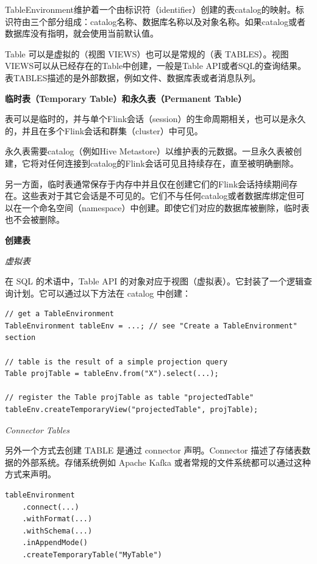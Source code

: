 \documentclass[cn,11pt,chinese]{elegantbook}
\begin{document}
TableEnvironment维护着一个由标识符（identifier）创建的表catalog的映射。标识符由三个部分组成：catalog名称、数据库名称以及对象名称。如果catalog或者数据库没有指明，就会使用当前默认值。

Table 可以是虚拟的（视图 VIEWS）也可以是常规的（表 TABLES）。视图VIEWS可以从已经存在的Table中创建，一般是Table API或者SQL的查询结果。表TABLES描述的是外部数据，例如文件、数据库表或者消息队列。

\textbf{临时表（Temporary Table）和永久表（Permanent Table）}

表可以是临时的，并与单个Flink会话（session）的生命周期相关，也可以是永久的，并且在多个Flink会话和群集（cluster）中可见。

永久表需要catalog（例如Hive Metastore）以维护表的元数据。一旦永久表被创建，它将对任何连接到catalog的Flink会话可见且持续存在，直至被明确删除。

另一方面，临时表通常保存于内存中并且仅在创建它们的Flink会话持续期间存在。这些表对于其它会话是不可见的。它们不与任何catalog或者数据库绑定但可以在一个命名空间（namespace）中创建。即使它们对应的数据库被删除，临时表也不会被删除。

\textbf{创建表}

\textit{虚拟表}

在 SQL 的术语中，Table API 的对象对应于视图（虚拟表）。它封装了一个逻辑查询计划。它可以通过以下方法在 catalog 中创建：

\begin{verbatim}
// get a TableEnvironment
TableEnvironment tableEnv = ...; // see "Create a TableEnvironment" section

// table is the result of a simple projection query 
Table projTable = tableEnv.from("X").select(...);

// register the Table projTable as table "projectedTable"
tableEnv.createTemporaryView("projectedTable", projTable);
\end{verbatim}

\textit{Connector Tables}

另外一个方式去创建 TABLE 是通过 connector 声明。Connector 描述了存储表数据的外部系统。存储系统例如 Apache Kafka 或者常规的文件系统都可以通过这种方式来声明。

\begin{verbatim}
tableEnvironment
    .connect(...)
    .withFormat(...)
    .withSchema(...)
    .inAppendMode()
    .createTemporaryTable("MyTable")
\end{verbatim}
\end{document}
